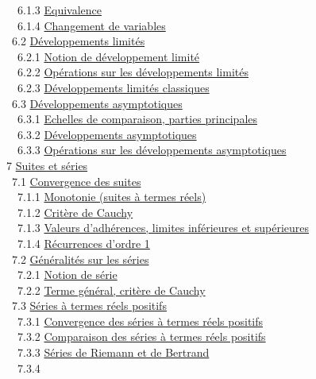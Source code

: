 \documentclass[]{article}
\begin{document}
~~6.1.3 \href{coursse32.html\#x41-1930006.1.3}{Equivalence} \\ ~~6.1.4
\href{coursse32.html\#x41-1940006.1.4}{Changement de variables} \\ ~6.2
\href{coursse33.html\#x42-1950006.2}{Développements limités} \\ ~~6.2.1
\href{coursse33.html\#x42-1960006.2.1}{Notion de développement limité}
\\ ~~6.2.2 \href{coursse33.html\#x42-1970006.2.2}{Opérations sur les
développements limités} \\ ~~6.2.3
\href{coursse33.html\#x42-1980006.2.3}{Développements limités
classiques} \\ ~6.3 \href{coursse34.html\#x43-1990006.3}{Développements
asymptotiques} \\ ~~6.3.1
\href{coursse34.html\#x43-2000006.3.1}{Echelles de comparaison, parties
principales} \\ ~~6.3.2
\href{coursse34.html\#x43-2010006.3.2}{Développements asymptotiques} \\
~~6.3.3 \href{coursse34.html\#x43-2020006.3.3}{Opérations sur les
développements asymptotiques} \\ 7
\href{coursch8.html\#x44-2030007}{Suites et séries} \\ ~7.1
\href{coursse35.html\#x45-2040007.1}{Convergence des suites} \\ ~~7.1.1
\href{coursse35.html\#x45-2050007.1.1}{Monotonie (suites à termes
réels)} \\ ~~7.1.2 \href{coursse35.html\#x45-2060007.1.2}{Critère de
Cauchy} \\ ~~7.1.3 \href{coursse35.html\#x45-2070007.1.3}{Valeurs
d'adhérences, limites inférieures et supérieures} \\ ~~7.1.4
\href{coursse35.html\#x45-2080007.1.4}{Récurrences d'ordre 1} \\ ~7.2
\href{coursse36.html\#x46-2090007.2}{Généralités sur les séries} \\
~~7.2.1 \href{coursse36.html\#x46-2100007.2.1}{Notion de série} \\
~~7.2.2 \href{coursse36.html\#x46-2110007.2.2}{Terme général, critère de
Cauchy} \\ ~7.3 \href{coursse37.html\#x47-2120007.3}{Séries à termes
réels positifs} \\ ~~7.3.1
\href{coursse37.html\#x47-2130007.3.1}{Convergence des séries à termes
réels positifs} \\ ~~7.3.2
\href{coursse37.html\#x47-2140007.3.2}{Comparaison des séries à termes
réels positifs} \\ ~~7.3.3 \href{coursse37.html\#x47-2150007.3.3}{Séries
de Riemann et de Bertrand} \\ ~~7.3.4
\end{document}
